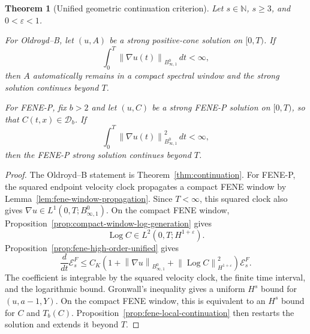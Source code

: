 \documentclass[11pt]{article}
\newtheorem{theorem}{Theorem}[section]
\newcommand{\Log}{\operatorname{Log}}
\newcommand{\calE}{\mathcal E}
\newcommand{\calD}{\mathcal D}
\newcommand{\eps}{\varepsilon}
\newcommand{\norm}[1]{\left\lVert #1\right\rVert}
\newcommand{\Besov}{B^0_{\infty,1}}
\begin{document}
\begin{theorem}[Unified geometric continuation criterion]
\label{thm:unified-continuation}
Let \(s\in\mathbb N\), \(s\ge3\), and \(0<\eps<1\).

For Oldroyd--B, let \((u,A)\) be a strong positive-cone solution on
\([0,T)\).  If
\[
  \int_0^T\norm{\nabla u(t)}_{\Besov}\,dt<\infty,
\]
then \(A\) automatically remains in a compact spectral window and the strong
solution continues beyond \(T\).

For FENE-P, fix \(b>2\) and let \((u,C)\) be a strong FENE-P solution on \([0,T)\), so that
\(C(t,x)\in\calD_b\).  If
\[
  \int_0^T\norm{\nabla u(t)}_{\Besov}^2\,dt<\infty,
\]
then the FENE-P strong solution continues beyond \(T\).
\end{theorem}

\begin{proof}
The Oldroyd--B statement is Theorem~\ref{thm:continuation}.  For FENE-P, the
squared endpoint velocity clock propagates a compact FENE window by
Lemma~\ref{lem:fene-window-propagation}.  Since \(T<\infty\), this squared
clock also gives \(\nabla u\in L^1(0,T;\Besov)\).  On the compact FENE window,
Proposition~\ref{prop:compact-window-log-generation} gives
\[
  \Log C\in L^2(0,T;H^{1+\eps}).
\]
Proposition~\ref{prop:fene-high-order-unified} gives
\[
  \frac{d}{dt}\calE_s^F
  \le
  C_K\left(1+\norm{\nabla u}_{\Besov}
  +\norm{\Log C}_{H^{1+\eps}}^2\right)\calE_s^F .
\]
The coefficient is integrable by the squared velocity clock, the finite time
interval, and the logarithmic bound.  Gronwall's inequality gives a uniform \(H^s\) bound for
\((u,a-1,Y)\).  On the compact FENE window, this is equivalent to an \(H^s\)
bound for \(C\) and \(T_b(C)\).  Proposition~\ref{prop:fene-local-continuation}
then restarts the solution and extends it beyond \(T\).
\end{proof}
\end{document}
